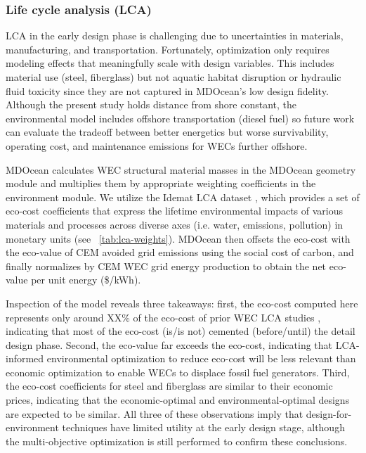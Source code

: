 \documentclass[10pt,twoside]{article}
\begin{document}
\subsubsection{Life cycle analysis (LCA)}
LCA in the early design phase is challenging due to uncertainties in materials, manufacturing, and transportation.
Fortunately, optimization only requires modeling effects that meaningfully scale with design variables.
This includes material use (steel, fiberglass) but not aquatic habitat disruption or hydraulic fluid toxicity since they are not captured in MDOcean's low design fidelity.
Although the present study holds distance from shore constant, the environmental model includes offshore transportation (diesel fuel) so future work can evaluate the tradeoff between better energetics but worse survivability, operating cost, and maintenance emissions for WECs further offshore.

MDOcean calculates WEC structural material masses in the MDOcean geometry module and multiplies them by appropriate weighting coefficients in the environment module.
We utilize the Idemat LCA dataset \cite{idemat}, which provides a set of eco-cost coefficients that express the lifetime environmental impacts of various materials and processes across diverse axes (i.e. water, emissions, pollution) in monetary units (see \tableautorefname~\ref{tab:lca-weights}).
MDOcean then offsets the eco-cost with the eco-value of CEM avoided grid emissions using the social cost of carbon, and finally normalizes by CEM WEC grid energy production to obtain the net eco-value per unit energy (\$/kWh).

Inspection of the model reveals three takeaways: first, the eco-cost computed here represents only around XX\% of the eco-cost of prior WEC LCA studies \cite{LCA}, indicating that most of the eco-cost (is/is not) cemented (before/until) the detail design phase.
Second, the eco-value far exceeds the eco-cost, indicating that LCA-informed environmental optimization to reduce eco-cost will be less relevant than economic optimization to enable WECs to displace fossil fuel generators.
Third, the eco-cost coefficients for steel and fiberglass are similar to their economic prices, indicating that the economic-optimal and environmental-optimal designs are expected to be similar.
All three of these observations imply that design-for-environment techniques have limited utility at the early design stage, although the multi-objective optimization is still performed to confirm these conclusions.
\end{document}
